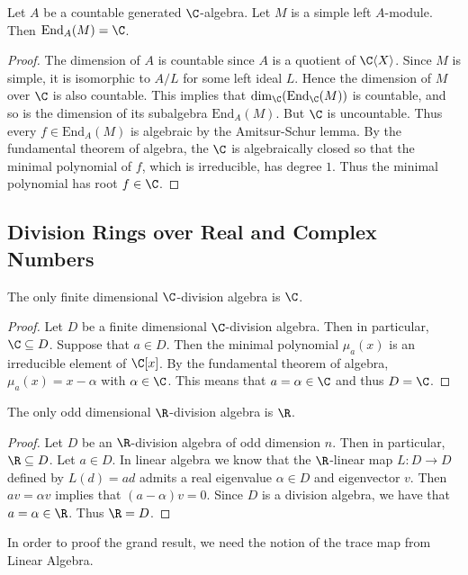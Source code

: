 \documentclass[a4paper]{article}
\begin{document}
\begin{crl}{}{} Let $A$ be a countable generated $\C$-algebra. Let $M$ is a simple left $A$-module. Then $\text{End}_A(M)=\C$. 
\begin{proof}
The dimension of $A$ is countable since $A$ is a quotient of $\C\langle X\rangle$. Since $M$ is simple, it is isomorphic to $A/L$ for some left ideal $L$. Hence the dimension of $M$ over $\C$ is also countable. This implies that $\dim_\C(\text{End}_\C(M))$ is countable, and so is the dimension of its subalgebra $\text{End}_A(M)$. But $\C$ is uncountable. Thus every $f\in\text{End}_A(M)$ is algebraic by the Amitsur-Schur lemma. By the fundamental theorem of algebra, the $\C$ is algebraically closed so that the minimal polynomial of $f$, which is irreducible, has degree $1$. Thus the minimal polynomial has root $f\in\C$. 
\end{proof}
\end{crl}

\subsection{Division Rings over Real and Complex Numbers}
\begin{prp}{}{} The only finite dimensional $\C$-division algebra is $\C$. 
\begin{proof}
Let $D$ be a finite dimensional $\C$-division algebra. Then in particular, $\C\subseteq D$. Suppose that $a\in D$. Then the minimal polynomial $\mu_a(x)$ is an irreducible element of $\C[x]$. By the fundamental theorem of algebra, $\mu_a(x)=x-\alpha$ with $\alpha\in\C$. This means that $a=\alpha\in\C$ and thus $D=\C$. 
\end{proof}
\end{prp}

\begin{prp}{}{} The only odd dimensional $\R$-division algebra is $\R$. 
\begin{proof}
Let $D$ be an $\R$-division algebra of odd dimension $n$. Then in particular, $\R\subseteq D$. Let $a\in D$. In linear algebra we know that the $\R$-linear map $L:D\to D$ defined by $L(d)=ad$ admits a real eigenvalue $\alpha\in D$ and eigenvector $v$. Then $av=\alpha v$ implies that $(a-\alpha)v=0$. Since $D$ is a division algebra, we have that $a=\alpha\in\R$. Thus $\R=D$. 
\end{proof}
\end{prp}

In order to proof the grand result, we need the notion of the trace map from Linear Algebra. 
\end{document}
